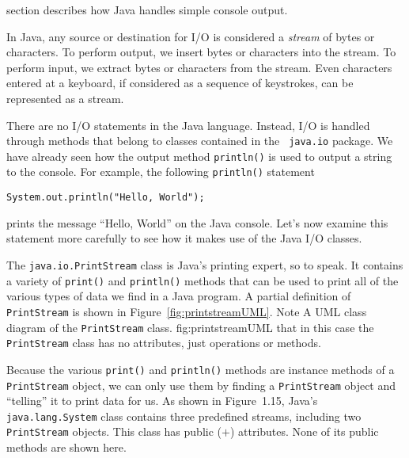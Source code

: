 section describes how Java handles simple console output.

In Java, any source or destination for I/O is considered a {\it
stream} of bytes or characters. To perform output, we insert bytes or
characters into the stream. To perform input, we extract bytes or
characters from the stream.  Even characters entered at a keyboard, if
considered as a sequence of keystrokes, can be represented as a
stream.


There are no I/O statements in the Java language.  Instead, I/O is
handled through methods that belong to classes contained in the {\tt
java.io} package. We have already seen how the
output method {\tt println()} is used to output a string
to the console. For example, the following {\tt println()} statement

\begin{jjjlisting}
\begin{lstlisting}
System.out.println("Hello, World");
\end{lstlisting}
\end{jjjlisting}

\noindent prints the message ``Hello, World'' on the
Java console.  Let's now examine this statement more carefully to see
how it makes use of the Java I/O classes.

The {\tt java.io.PrintStream} class is Java's printing expert, so to
speak. It contains a variety of {\tt print()} and {\tt println()}
methods that can be used to print all of the various types of data we
find in a Java program.  A partial definition of {\tt PrintStream} is
shown in Figure~\ref{fig:printstreamUML}. Note
{A UML class diagram of the {\tt PrintStream} class.}
{fig:printstreamUML}
that in this case the {\tt PrintStream} class has no attributes,
just operations or methods.

Because the various {\tt print()} and {\tt println()} methods are
instance methods of a {\tt PrintStream} object, we can only use them
by finding a {\tt PrintStream} object and ``telling'' it to print data
for us.  As shown in Figure~1.15, Java's {\tt java.lang.System} class
contains three predefined streams, including two {\tt PrintStream}
objects. This class has public ($+$) attributes.  None of its public
methods are shown here. 

